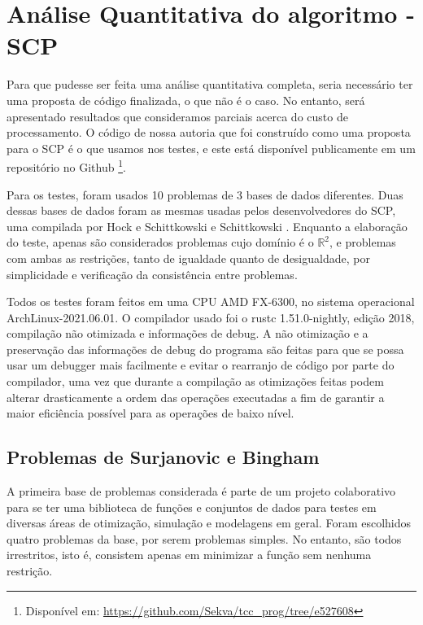 \section{Análise Quantitativa do algoritmo - SCP}

Para que pudesse ser feita uma análise quantitativa completa, seria necessário ter uma
proposta de código finalizada, o que não é o caso. No entanto, será apresentado
resultados que consideramos parciais acerca do custo de processamento.
O código de nossa autoria que foi construído como uma proposta para o SCP é
o que usamos nos testes, e este está disponível publicamente em um repositório no Github
\footnote{Disponível em: \url{https://github.com/Sekva/tcc_prog/tree/e527608}}.

Para os testes, foram usados 10 problemas de 3 bases de dados diferentes.
Duas dessas bases de dados foram as mesmas usadas pelos desenvolvedores do
SCP, uma compilada por Hock e Schittkowski \cite{Hock1981}
e Schittkowski \cite{Schittkowski1987}. Enquanto a elaboração do teste, apenas são
considerados problemas cujo domínio é o \(\mathbb{R}^2\), e problemas com ambas as
restrições, tanto de igualdade quanto de desigualdade, por simplicidade e
verificação da consistência entre problemas.

Todos os testes foram feitos em uma CPU AMD FX-6300, no sistema operacional
ArchLinux-2021.06.01. O compilador usado foi o rustc 1.51.0-nightly, edição 2018,
compilação não otimizada e informações de debug. A não otimização e a preservação
das informações de debug do programa são feitas para que se possa usar um debugger
mais facilmente e evitar o rearranjo de código por parte do compilador, uma vez
que durante a compilação as otimizações feitas podem alterar drasticamente a
ordem das operações executadas a fim de garantir a maior eficiência possível
para as operações de baixo nível.

\subsection{Problemas de Surjanovic e Bingham}

A primeira base de problemas considerada \cite{sfuca} é parte de um projeto colaborativo
para se ter uma biblioteca de funções e conjuntos de dados para testes em diversas
áreas de otimização, simulação e modelagens em geral. Foram escolhidos quatro
problemas da base, por serem problemas simples. No entanto, são todos irrestritos,
isto é, consistem apenas em minimizar a função sem nenhuma restrição.


